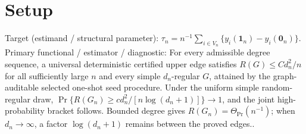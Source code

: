 \documentclass{article}
\begin{document}
\section{Setup}

Target (estimand / structural parameter): \(\tau_n=n^{-1}\sum_{i\in V_n}\{y_i(\mathbf 1_n)-y_i(\mathbf 0_n)\}\).
Primary functional / estimator / diagnostic: For every admissible degree sequence, a universal deterministic certified upper edge satisfies \(R(G)\le C d_n^2/n\) for all sufficiently large \(n\) and every simple \(d_n\)-regular \(G\), attained by the graph-auditable selected one-shot seed procedure. Under the uniform simple random-regular draw, \(\Pr\{R(G_n)\ge c d_n^2/[n\log(d_n+1)]\}\to1\), and the joint high-probability bracket follows. Bounded degree gives \(R(G_n)=\Theta_{\Pr}(n^{-1})\); when \(d_n\to\infty\), a factor \(\log(d_n+1)\) remains between the proved edges..
\end{document}
